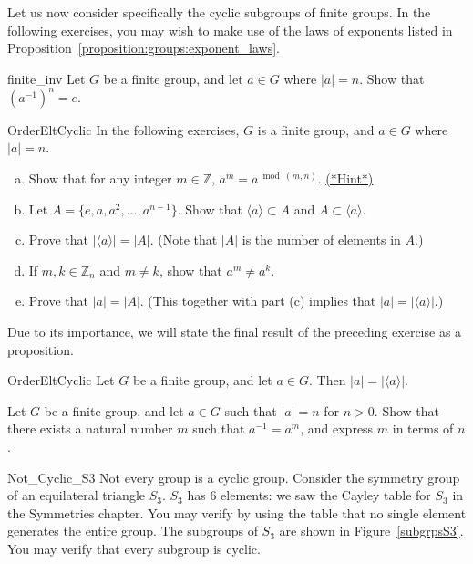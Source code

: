 Let us now consider specifically the cyclic subgroups of finite groups. In the following exercises, you may wish to make use of 
the laws of exponents listed in Proposition~\ref{proposition:groups:exponent_laws}.

\begin{exercise}{finite_inv}
Let $G$ be a finite group, and let $a \in G$ where $|a|=n$. Show that $(a^{-1})^n = e$.
\end{exercise}

\begin{exercise}{OrderEltCyclic}
In the following exercises, $G$ is a finite group, and  $a \in G$ where $|a|=n$. 
\begin{enumerate}[(a)]
\item
Show that for any integer $m \in \mathbb{Z}$, $a^m = a^{\bmod(m,n)}$.
\hyperref[sec:groups:hints]{(*Hint*)} 
\item
Let $A = \{e,a,a^2,\ldots,a^{n-1}\}$.  Show that $\langle a \rangle \subset A$ and $A \subset \langle a \rangle$.
\item 
Prove that $| \langle a \rangle | = |A|$. (Note that $|A|$ is the number of elements in $A$.)
\item
If $m,k \in \mathbb{Z}_n$ and $m \ne k$, show that $a^m \ne a^k$.
\item
Prove that $|a| =|A|$.  (This together with part (c) implies that $|a| =  | \langle a \rangle |$.)
\end{enumerate}
\end{exercise}

Due to its importance, we will state the final result of the preceding exercise as a proposition.

\begin{prop}{OrderEltCyclic}
Let $G$ be a finite group, and let $a \in G$.  Then $|a|=| \langle a \rangle |$.
\end{prop}

\begin{exercise}{97}
Let $G$ be a finite group, and let $a \in G$ such that $|a| = n$ for $n>0$. Show that there exists a natural number $m$ such that $a^{-1} = a^m$, and express $m$ in terms of $n$.
\end{exercise}

 
\begin{example}{Not_Cyclic_S3}
Not every group is a cyclic group.  Consider the symmetry group of an
equilateral triangle $S_3$.  $S_3$ has 6 elements: we saw the Cayley table for $S_3$ in the Symmetries chapter.  You may verify by using the table that no single element generates the entire group.
The subgroups of $S_3$ are shown in
Figure~\ref{subgrpsS3}.  You may verify  that every subgroup is cyclic.
\hspace*{1in}
\end{example}



